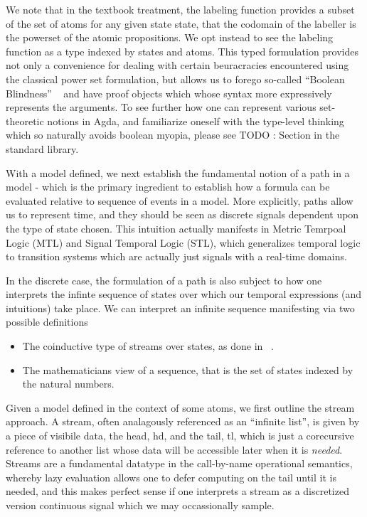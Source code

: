 \documentclass{article}
\newcommand{\pink}[1]{\textcolor{hotmagenta}{#1}}
\begin{document}
We note that in the textbook treatment, the labeling function provides a subset
of the set of atoms for any given state state, that the codomain of the labeller
is the powerset of the atomic propositions. We opt instead to see the labeling
function as a type indexed by states and atoms. This typed formulation provides
not only a convenience for dealing with certain beuracracies encountered using
the classical power set formulation, but allows us to forego so-called ``Boolean
Blindness'' ~\cite{harperBlindness} and have proof objects which whose syntax
more expressively represents the arguments. To see further how one can represent
various set-theoretic notions in Agda, and familiarize oneself with the
type-level thinking which so naturally avoids boolean myopia, please see TODO :
Section in the standard library.

With a model defined, we next establish the fundamental notion of a path in a
model - which is the primary ingredient to establish how a formula can be
evaluated relative to sequence of events in a model. More explicitly, paths
allow us to represent time, and they should be seen as discrete signals
dependent upon the type of state chosen. This intuition actually manifests in
Metric Temrpoal Logic (MTL) and Signal Temporal Logic (STL), which generalizes
temporal logic to transition systems which are actually just signals with a
real-time domains.

In the discrete case, the formulation of a path is also subject to how one
interprets the infinte sequence of states over which our temporal expressions
(and intuitions) take place. We can interpret an infinite sequence manifesting
via two possible definitions

\begin{itemize}
\item The coinductive type of streams over states, as done in ~\cite{coqLTL}.
\item The mathematicians view of a sequence, that is the set of states indexed
by the natural numbers.
\end{itemize}

Given a model defined in the context of some atoms, we first outline the stream
approach. A stream, often analagously referenced as an ``infinite list'', is
given by a piece of visibile data, the head, \pink{hd}, and the tail, \pink{tl},
which is just a corecursive reference to another list whose data will be
accessible later when it is \emph{needed}. Streams are a fundamental datatype
in the call-by-name operational semantics, whereby lazy evaluation allows one to
defer computing on the tail until it is needed, and this makes perfect sense if
one interprets a stream as a discretized version continuous signal which we may
occassionally sample.
\end{document}
